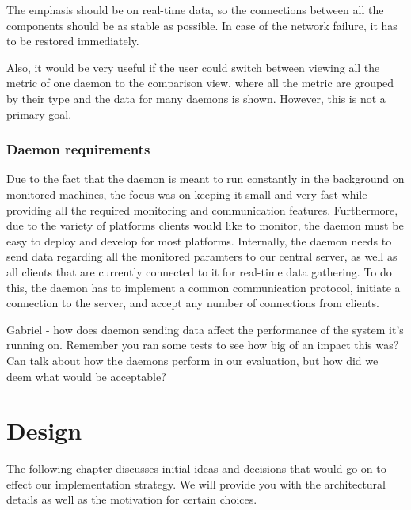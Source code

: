 \documentclass{l3proj}
\begin{document}
The emphasis should be on real-time data, so the connections between all the components should be as stable as possible. In case of the network failure, it has to be restored immediately. 

Also, it would be very useful if the user could switch between viewing all the metric of one daemon to the comparison view, where all the metric are grouped by their type and the data for many daemons is shown. However, this is not a primary goal.

\subsection{Daemon requirements}

Due to the fact that the daemon is meant to run constantly in the background on monitored machines, the focus was on keeping it small and very fast while providing all the required monitoring and communication features.
Furthermore, due to the variety of platforms clients would like to monitor, the daemon must be easy to deploy and develop for most platforms.
Internally, the daemon needs to send data regarding all the monitored paramters to our central server, as well as all clients that are currently connected to it for real-time data gathering.
To do this, the daemon has to implement a common communication protocol, initiate a connection to the server, and accept any number of connections from clients.


Gabriel - how does daemon sending data affect the performance of the system it's running on. Remember you ran some tests to see how big of an impact this was? Can talk about how the daemons perform in our evaluation, but how did we deem what would be acceptable?



\chapter{Design}
\label{design}

The following chapter discusses initial ideas and decisions that would go on to effect our implementation strategy. We will provide you with the architectural details as well as the motivation for certain choices.
\end{document}
